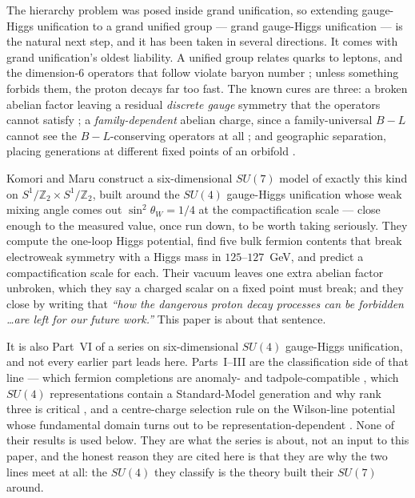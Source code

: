 \documentclass[11pt,a4paper]{article}
\newcommand{\ZZ}{\mathbb{Z}}
\newcommand{\su}[1]{SU(#1)}
\begin{document}
The hierarchy problem was posed inside grand unification, so extending gauge-Higgs unification to a
grand unified group --- grand gauge-Higgs unification --- is the natural next step, and it has been
taken in several directions. It comes with grand unification's oldest liability. A unified group
relates quarks to leptons, and the dimension-6 operators that follow violate baryon number
\cite{Weinberg,WZ}; unless something forbids them, the proton decays far too fast. The known cures
are three: a broken abelian factor leaving a residual \emph{discrete gauge} symmetry that the
operators cannot satisfy \cite{KW,IR}; a \emph{family-dependent} abelian charge, since a
family-universal $B-L$ cannot see the $B-L$-conserving operators at all \cite{FamilyU1}; and
geographic separation, placing generations at different fixed points of an orbifold \cite{Raby,OrbGUT}.

Komori and Maru \cite{KM25} construct a six-dimensional $\su7$ model of exactly this kind on
$S^1/\ZZ_2\times S^1/\ZZ_2$, built around the $\su4$ gauge-Higgs unification whose weak mixing angle
comes out $\sin^2\theta_W=1/4$ at the compactification scale \cite{AHMN} --- close enough to the
measured value, once run down, to be worth taking seriously. They compute the one-loop Higgs
potential, find five bulk fermion contents that break electroweak symmetry with a Higgs mass in
$125$--$127$~GeV, and predict a compactification scale for each. Their vacuum leaves one extra
abelian factor unbroken, which they say a charged scalar on a fixed point must break; and they close
by writing that \emph{``how the dangerous proton decay processes can be forbidden \dots are left for
our future work.''} This paper is about that sentence.

It is also Part~VI of a series on six-dimensional $\su4$ gauge-Higgs unification, and not every
earlier part leads here. Parts~I--III are the classification side of that line --- which fermion
completions are anomaly- and tadpole-compatible \cite{PartI}, which $\su4$ representations contain a
Standard-Model generation and why rank three is critical \cite{PartII}, and a centre-charge selection
rule on the Wilson-line potential whose fundamental domain turns out to be representation-dependent
\cite{PartIII}. None of their results is used below. They are what the series is about, not an input
to this paper, and the honest reason they are cited here is that they are why the two lines meet at
all: the $\su4$ they classify is the theory \cite{KM25} built their $\su7$ around.
\end{document}
